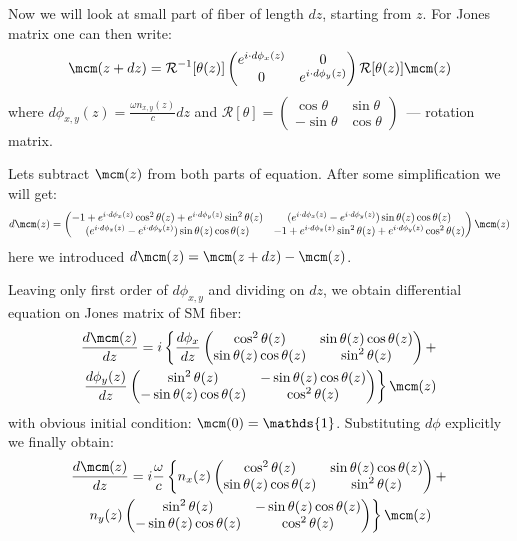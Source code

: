 \documentclass[12pt, notitlepage]{report}
\begin{document}
	Now we will look at small part of fiber of length $dz$, starting from $z$. For Jones matrix one can then write:
	$$
	\mcm(z+dz) = \mathcal{R}^{-1}[\theta(z)]\begin{pmatrix}
		e^{i\cdot d\phi_x(z)} & 0 \\
		0 & e^{i\cdot d\phi_y(z)}
	\end{pmatrix}\mathcal{R}[\theta(z)]\mcm(z)
	$$ 
	where $d\phi_{x,y}(z) = \frac{\omega n_{x,y}(z)}{c}dz$ and $\mathcal{R}[\theta] = \begin{pmatrix}
		\cos\theta & \sin\theta\\ -\sin\theta & \cos\theta
	\end{pmatrix}$~--- rotation matrix.

	Lets subtract $\mcm(z)$ from both parts of equation. After some simplification we will get:
	$$
	d\mcm(z) = \begin{pmatrix}
		-1 + e^{i\cdot d\phi_x(z)} \cos^2\theta(z) + e^{i\cdot d\phi_y(z)} \sin^2\theta(z) & (e^{i\cdot d\phi_x(z)} - e^{i\cdot d\phi_y(z)}) \sin\theta(z)\cos\theta(z) \\
		(e^{i\cdot d\phi_x(z)} - e^{i\cdot d\phi_y(z)}) \sin\theta(z)\cos\theta(z) & -1 + e^{i\cdot d\phi_x(z)} \sin^2\theta(z) + e^{i\cdot d\phi_y(z)} \cos^2\theta(z) 
	\end{pmatrix}\mcm(z)
	$$
	here we introduced $d\mcm(z) = \mcm(z+dz) - \mcm(z)$.
	
	Leaving only first order of $d\phi_{x,y}$ and dividing on $dz$, we obtain differential equation on Jones matrix of SM fiber:
	\begin{multline*}
		\dfrac{d\mcm(z)}{dz} = i\left\{\dfrac{d\phi_x}{dz}\begin{pmatrix}
		\cos^2\theta(z) & \sin\theta(z)\cos\theta(z) \\
		\sin\theta(z)\cos\theta(z) & \sin^2\theta(z)
	\end{pmatrix} + \right. \\ \left.
 		\dfrac{d\phi_y(z)}{dz}\begin{pmatrix}
	\sin^2\theta(z) & -\sin\theta(z)\cos\theta(z) \\
	-\sin\theta(z)\cos\theta(z) & \cos^2\theta(z)
	\end{pmatrix}
	\right\}\mcm(z)
	\end{multline*}
	with obvious initial condition: $\mcm(0)=\mathds{1}$. Substituting $d\phi$ explicitly we finally obtain:
	\begin{multline}
		\label{main}
		\dfrac{d\mcm(z)}{dz} = i\dfrac{\omega}{c}\left\{n_x(z)\begin{pmatrix}
			\cos^2\theta(z) & \sin\theta(z)\cos\theta(z) \\
			\sin\theta(z)\cos\theta(z) & \sin^2\theta(z)
		\end{pmatrix} + \right. \\ \left.
		n_y(z)\begin{pmatrix}
			\sin^2\theta(z) & -\sin\theta(z)\cos\theta(z) \\
			-\sin\theta(z)\cos\theta(z) & \cos^2\theta(z)
		\end{pmatrix}
		\right\}\mcm(z)
	\end{multline}
\end{document}
